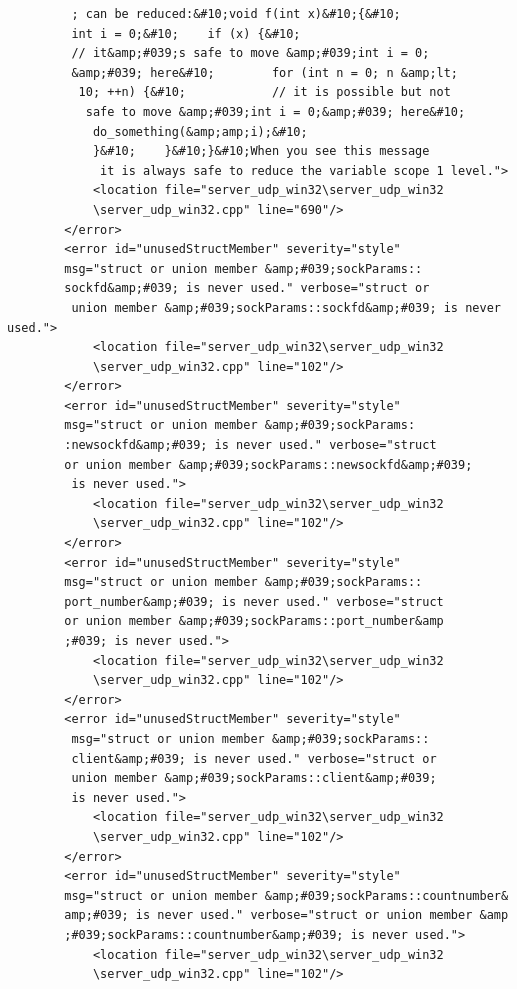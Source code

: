 \documentclass[10pt,a4paper]{report}
\begin{document}
\begin{lstlisting}
         ; can be reduced:&#10;void f(int x)&#10;{&#10;    
         int i = 0;&#10;    if (x) {&#10;        
         // it&amp;#039;s safe to move &amp;#039;int i = 0;
         &amp;#039; here&#10;        for (int n = 0; n &amp;lt;
          10; ++n) {&#10;            // it is possible but not
           safe to move &amp;#039;int i = 0;&amp;#039; here&#10;
            do_something(&amp;amp;i);&#10;        
            }&#10;    }&#10;}&#10;When you see this message
             it is always safe to reduce the variable scope 1 level.">
            <location file="server_udp_win32\server_udp_win32
            \server_udp_win32.cpp" line="690"/>
        </error>
        <error id="unusedStructMember" severity="style" 
        msg="struct or union member &amp;#039;sockParams::
        sockfd&amp;#039; is never used." verbose="struct or
         union member &amp;#039;sockParams::sockfd&amp;#039; is never used.">
            <location file="server_udp_win32\server_udp_win32
            \server_udp_win32.cpp" line="102"/>
        </error>
        <error id="unusedStructMember" severity="style" 
        msg="struct or union member &amp;#039;sockParams:
        :newsockfd&amp;#039; is never used." verbose="struct 
        or union member &amp;#039;sockParams::newsockfd&amp;#039;
         is never used.">
            <location file="server_udp_win32\server_udp_win32
            \server_udp_win32.cpp" line="102"/>
        </error>
        <error id="unusedStructMember" severity="style" 
        msg="struct or union member &amp;#039;sockParams::
        port_number&amp;#039; is never used." verbose="struct 
        or union member &amp;#039;sockParams::port_number&amp
        ;#039; is never used.">
            <location file="server_udp_win32\server_udp_win32
            \server_udp_win32.cpp" line="102"/>
        </error>
        <error id="unusedStructMember" severity="style"
         msg="struct or union member &amp;#039;sockParams::
         client&amp;#039; is never used." verbose="struct or 
         union member &amp;#039;sockParams::client&amp;#039; 
         is never used.">
            <location file="server_udp_win32\server_udp_win32
            \server_udp_win32.cpp" line="102"/>
        </error>
        <error id="unusedStructMember" severity="style" 
        msg="struct or union member &amp;#039;sockParams::countnumber&
        amp;#039; is never used." verbose="struct or union member &amp
        ;#039;sockParams::countnumber&amp;#039; is never used.">
            <location file="server_udp_win32\server_udp_win32
            \server_udp_win32.cpp" line="102"/>

\end{lstlisting}
\end{document}
